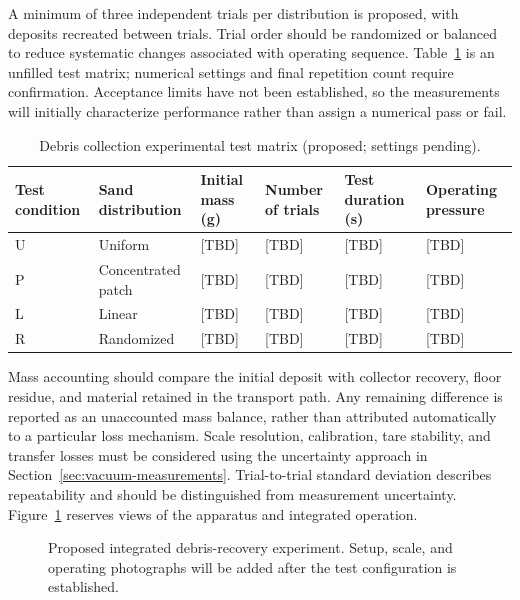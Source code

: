 A minimum of three independent trials per distribution is proposed, with deposits recreated between trials. Trial order should be randomized or balanced to reduce systematic changes associated with operating sequence. Table~\ref{tab:collection-matrix} is an unfilled test matrix; numerical settings and final repetition count require confirmation. Acceptance limits have not been established, so the measurements will initially characterize performance rather than assign a numerical pass or fail.

\begin{table}[htbp]\centering
\caption{Debris collection experimental test matrix (proposed; settings pending).}
\label{tab:collection-matrix}
\begingroup\footnotesize\singlespacing\renewcommand{\arraystretch}{1.25}
\begin{tabularx}{\textwidth}{@{}XXXXXX@{}}\toprule
Test condition & Sand distribution & Initial mass (g) & Number of trials & Test duration (s) & Operating pressure \\\midrule
U & Uniform & [TBD] & [TBD] & [TBD] & [TBD] \\
P & Concentrated patch & [TBD] & [TBD] & [TBD] & [TBD] \\
L & Linear & [TBD] & [TBD] & [TBD] & [TBD] \\
R & Randomized & [TBD] & [TBD] & [TBD] & [TBD] \\
\bottomrule\end{tabularx}\endgroup
\par{}
\end{table}

Mass accounting should compare the initial deposit with collector recovery, floor residue, and material retained in the transport path. Any remaining difference is reported as an unaccounted mass balance, rather than attributed automatically to a particular loss mechanism. Scale resolution, calibration, tare stability, and transfer losses must be considered using the uncertainty approach in Section~\ref{sec:vacuum-measurements}. Trial-to-trial standard deviation describes repeatability and should be distinguished from measurement uncertainty. Figure~\ref{fig:collection-setup} reserves views of the apparatus and integrated operation.

\begin{figure}[htbp]\centering
{}\hfill
{}\par\medskip
{}
\caption{Proposed integrated debris-recovery experiment. Setup, scale, and operating photographs will be added after the test configuration is established.}
\label{fig:collection-setup}
\end{figure}

